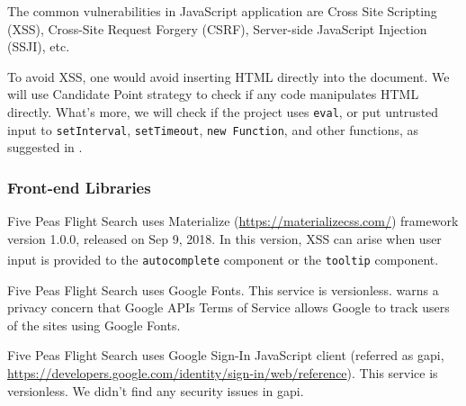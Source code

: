 \documentclass[12pt, a4paper]{article}
\newcommand{\code}[1]{\texttt{#1}}
\begin{document}
The common vulnerabilities in JavaScript application are Cross Site Scripting (XSS), Cross-Site Request Forgery (CSRF), Server-side JavaScript Injection (SSJI), etc. 

To avoid XSS, one would avoid inserting HTML directly into the document. We will use Candidate Point strategy to check if any code manipulates HTML directly. What's more, we will check if the project uses \code{eval}, or put untrusted input to \code{setInterval}, \code{setTimeout}, \code{new Function}, and other functions, as suggested in \cite{secure-javascript}.















\subsubsection{Front-end Libraries}
Five Peas Flight Search uses Materialize (\url{https://materializecss.com/}) framework version 1.0.0, released on Sep 9, 2018. In this version, XSS can arise when user input is provided to the \code{autocomplete} component or the \code{tooltip} component.\textsuperscript{\cite{materialize-vulnerabilities}}

Five Peas Flight Search uses Google Fonts. This service is versionless. \cite{google-fonts-privacy} warns a privacy concern that Google APIs Terms of Service allows Google to track users of the sites using Google Fonts. 

Five Peas Flight Search uses Google Sign-In JavaScript client (referred as gapi, \url{https://developers.google.com/identity/sign-in/web/reference}). This service is versionless. We didn't find any security issues in gapi.
\end{document}
